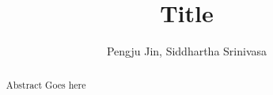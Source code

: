 \documentclass[letterpaper,conference,10pt]{ieeetran}
\begin{document}
\title{\vspace{0.20in}\LARGE Title}

\author{Pengju Jin, Siddhartha Srinivasa}
\maketitle 	

\begin{abstract}
Abstract Goes here
\end{abstract}

\IEEEpeerreviewmaketitle











\footnotesize{


}
\end{document}
